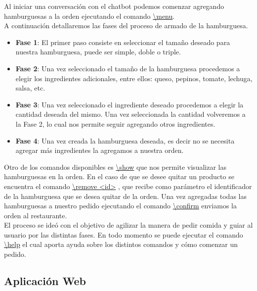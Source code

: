 \documentclass[a4paper,12pt]{article}
\begin{document}
Al iniciar una conversación con el chatbot podemos comenzar agregando hamburguesas a la orden ejecutando el comando
\color{blue}\uline{\textbackslash menu}\color{black}. 
\\
A continuación detallaremos las fases del proceso de armado de la hamburguesa.

\begin{itemize}
	
	\item \textbf{Fase 1}: El primer paso consiste en seleccionar el tamaño deseado para nuestra hamburguesa, puede ser simple, doble o triple.
	
	\item \textbf{Fase 2}: Una vez seleccionado el tamaño de la hamburguesa procedemos a elegir los ingredientes adicionales, entre ellos: queso, pepinos, tomate, lechuga, salsa, etc. 
	
	\item \textbf{Fase 3}: Una vez seleccionado el ingrediente deseado procedemos a elegir la cantidad deseada del mismo. Una vez seleccionada la cantidad volveremos a la Fase 2, lo cual nos permite seguir agregando otros ingredientes.
	
	\item \textbf{Fase 4}: Una vez creada la hamburguesa deseada, es decir no se necesita agregar más ingredientes la agregamos a nuestra orden.	
	
\end{itemize}

Otro de los comandos disponibles es \color{blue}\uline{\textbackslash show}\color{black}
que nos permite visualizar las hamburguesas en la orden. En el caso de que se desee quitar un producto se encuentra el comando
\color{blue}\uline{\textbackslash remove <id>}\color{black}
, que recibe como parámetro el identificador de la hamburguesa que se desea quitar de la orden. Una vez agregadas todas las hamburguesas a nuestro pedido ejecutando el comando 
\color{blue}\uline{\textbackslash confirm}\color{black} 
enviamos la orden al restaurante.
\\
El proceso se ideó con el objetivo de agilizar la manera de pedir comida y guiar al usuario por las distintas fases. En todo momento se puede ejecutar el comando 
\color{blue}\uline{\textbackslash help}\color{black}
el cual aporta ayuda sobre los distintos comandos y cómo comenzar un pedido.

\subsection{Aplicación Web}
\end{document}
